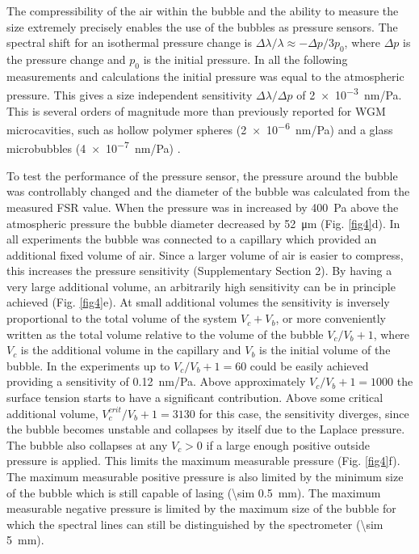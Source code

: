 \documentclass[a4paper,12pt]{article}
\begin{document}
	
	The compressibility of the air within the bubble and the ability to measure the size extremely precisely enables the use of the bubbles as pressure sensors. The spectral shift for an isothermal pressure change is $\Delta \lambda/\lambda \approx - \Delta p/3 p_0$, where $\Delta p$ is the pressure change and $p_0$ is the initial pressure. In all the following measurements and calculations the initial pressure was equal to the atmospheric pressure. This gives a size independent sensitivity $\Delta \lambda/\Delta p$ of \SI{2e-3}{nm/Pa}. This is several orders of magnitude more than previously reported for WGM microcavities, such as hollow polymer spheres (\SI{2e-6}{nm/Pa}) \cite{ioppolo2007pressure} and a glass microbubbles (\SI{4e-7}{nm/Pa}) \cite{henze2011tuning}. 
	
	To test the performance of the pressure sensor, the pressure around the bubble was controllably changed and the diameter of the bubble was calculated from the measured FSR value. When the pressure was in increased by \SI{400}{Pa} above the atmospheric pressure the bubble diameter decreased by \SI{52}{\micro m} (Fig. \ref{fig4}d). In all experiments the bubble was connected to a capillary which provided an additional fixed volume of air. Since a larger volume of air is easier to compress, this increases the pressure sensitivity (Supplementary Section 2). By having a very large additional volume, an arbitrarily high sensitivity can be in principle achieved (Fig. \ref{fig4}e). At small additional volumes the sensitivity is inversely proportional to the total volume of the system  $V_c+V_b$, or more conveniently written as the total volume relative to the volume of the bubble $V_c/V_b+1$, where $V_c$ is the additional volume in the capillary and $V_b$ is the initial volume of the bubble. In the experiments up to $V_c/V_b+1=60$ could be easily achieved providing a sensitivity of \SI{0.12}{nm/Pa}. Above approximately $V_c/V_b+1=1000$ the surface tension starts to have a significant contribution. Above some critical additional volume, $V_c^{crit}/V_b+1=3130$ for this case, the sensitivity diverges, since the bubble becomes unstable and collapses by itself due to the Laplace pressure. The bubble also collapses at any $V_c>0$ if a large enough positive outside pressure is applied. This limits the maximum measurable pressure (Fig. \ref{fig4}f). The maximum measurable positive pressure is also limited by the minimum size of the bubble which is still capable of lasing (\SI{\sim 0.5}{mm}). The maximum measurable negative pressure is limited by the maximum size of the bubble for which the spectral lines can still be distinguished by the spectrometer (\SI{\sim 5}{mm}). 
	
\end{document}
